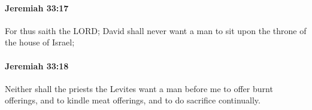 		\paragraph{Jeremiah 33:17} %
			\label{JEREMIAH-33-17}

			For thus saith the LORD; David shall never want a man to sit upon the throne of the house of Israel;


		\paragraph{Jeremiah 33:18} %
			\label{JEREMIAH-33-18}

			Neither shall the priests the Levites want a man before me to offer burnt offerings, and to kindle meat offerings, and to do sacrifice continually.


